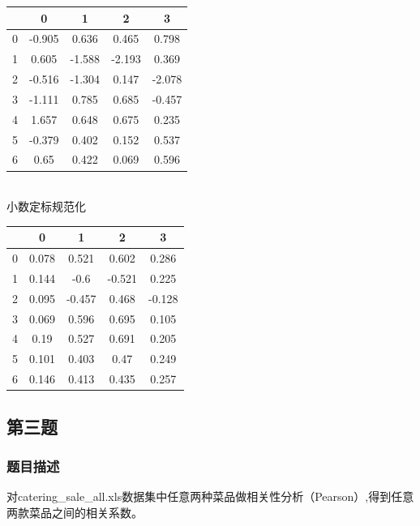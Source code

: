 \documentclass{article}
\begin{document}
            \begin{table}[H]
                \centering
                \begin{tabular}{ c  c  c  c  c}\toprule
                  & 0 & 1 & 2 & 3\\\hline
                0 & -0.905 & 0.636 & 0.465 & 0.798\\
                1 & 0.605 & -1.588 & -2.193 & 0.369\\
                2 & -0.516 & -1.304 & 0.147 & -2.078\\
                3 & -1.111 & 0.785 & 0.685 & -0.457\\
                4 & 1.657 & 0.648 & 0.675 & 0.235\\
                5 & -0.379 & 0.402 & 0.152 & 0.537\\
                6 & 0.65 & 0.422 & 0.069 & 0.596\\
                \bottomrule
                \end{tabular}
            \end{table}    
            \leavevmode\\小数定标规范化\\
            \begin{table}[H]
                \centering
                \begin{tabular}{ c  c  c  c c}\toprule
                  & 0 & 1 & 2 & 3\\\hline
                0 & 0.078 & 0.521 & 0.602 & 0.286\\
                1 & 0.144 & -0.6 & -0.521 & 0.225\\
                2 & 0.095 & -0.457 & 0.468 & -0.128\\
                3 & 0.069 & 0.596 & 0.695 & 0.105\\
                4 & 0.19 & 0.527 & 0.691 & 0.205\\
                5 & 0.101 & 0.403 & 0.47 & 0.249\\
                6 & 0.146 & 0.413 & 0.435 & 0.257\\
                \bottomrule
                \end{tabular}
            \end{table}                
    \subsection{第三题}
        \subsubsection{题目描述}
            对catering\_sale\_all.xls数据集中任意两种菜品做相关性分析（Pearson）,得到任意两款菜品之间的相关系数。
\end{document}
